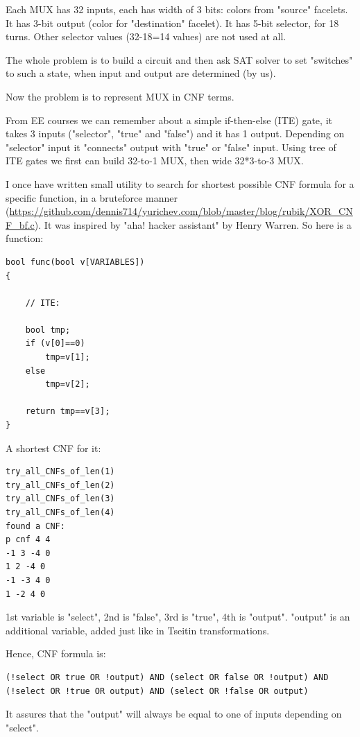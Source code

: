 Each MUX has 32 inputs, each has width of 3 bits: colors from "source" facelets.
It has 3-bit output (color for "destination" facelet).
It has 5-bit selector, for 18 turns. Other selector values (32-18=14 values) are not used at all.

The whole problem is to build a circuit and then ask SAT solver to set "switches" to such a state,
when input and output are determined (by us).

Now the problem is to represent MUX in CNF terms.

From \ac{EE} courses we can remember about a simple if-then-else (ITE) gate, it takes 3 inputs
("selector", "true" and "false") and it has 1 output.
Depending on "selector" input it "connects" output with "true" or "false" input.
Using tree of ITE gates we first can build 32-to-1 MUX, then wide 32*3-to-3 MUX.

I once have written small utility to search for shortest possible CNF formula for a specific function,
in a bruteforce manner (\url{https://github.com/dennis714/yurichev.com/blob/master/blog/rubik/XOR_CNF_bf.c}).
It was inspired by "aha! hacker assistant" by Henry Warren.
So here is a function:

\begin{lstlisting}
bool func(bool v[VARIABLES])
{

	// ITE:

	bool tmp;
	if (v[0]==0)
		tmp=v[1];
	else
		tmp=v[2];

	return tmp==v[3];
}
\end{lstlisting}

A shortest CNF for it:

\begin{lstlisting}
try_all_CNFs_of_len(1)
try_all_CNFs_of_len(2)
try_all_CNFs_of_len(3)
try_all_CNFs_of_len(4)
found a CNF:
p cnf 4 4
-1 3 -4 0
1 2 -4 0
-1 -3 4 0
1 -2 4 0
\end{lstlisting}

1st variable is "select", 2nd is "false", 3rd is "true", 4th is "output".
"output" is an additional variable, added just like in Tseitin transformations.

Hence, CNF formula is:

\begin{lstlisting}
(!select OR true OR !output) AND (select OR false OR !output) AND (!select OR !true OR output) AND (select OR !false OR output)
\end{lstlisting}

It assures that the "output" will always be equal to one of inputs depending on "select".

